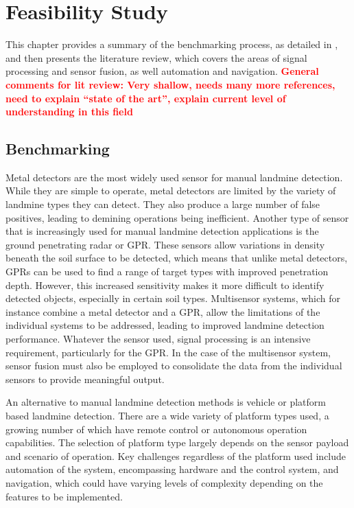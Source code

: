 \documentclass[main.tex]{subfiles}
\begin{document}
\chapter{Feasibility Study}
This chapter provides a summary of the benchmarking process, as detailed in , and then presents the literature review, which covers the areas of signal processing and sensor fusion, as well automation and navigation. \textcolor{red}{\textbf{General comments for lit review: Very shallow, needs many more references, need to explain ``state of the art'', explain current level of understanding in this field }}

\section{Benchmarking}
Metal detectors are the most widely used sensor for manual landmine detection. While they are simple to operate, metal detectors are limited by the variety of landmine types they can detect. They also produce a large number of false positives, leading to demining operations being inefficient. Another type of sensor that is increasingly used for manual landmine detection applications is the ground penetrating radar or GPR. These sensors allow variations in density beneath the soil surface to be detected, which means that unlike metal detectors, GPRs can be used to find a range of target types with improved penetration depth. However, this increased sensitivity makes it more difficult to identify detected objects, especially in certain soil types. Multisensor systems, which for instance combine a metal detector and a GPR, allow the limitations of the individual systems to be addressed, leading to improved landmine detection performance. Whatever the sensor used, signal processing is an intensive requirement, particularly for the GPR. In the case of the multisensor system, sensor fusion must also be employed to consolidate the data from the individual sensors to provide meaningful output.  

An alternative to manual landmine detection methods is vehicle or platform based landmine detection. There are a wide variety of platform types used, a growing number of which have remote control or autonomous operation capabilities. The selection of platform type largely depends on the sensor payload and scenario of operation. Key challenges regardless of the platform used include automation of the system, encompassing hardware and the control system, and navigation, which could have varying levels of complexity depending on the features to be implemented. 
\end{document}
